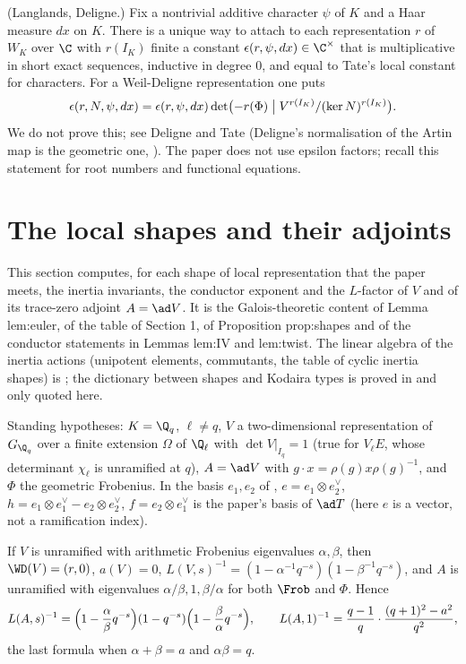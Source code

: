 \begin{theorem}\label{thm:local:epsilon}
(Langlands, Deligne.) Fix a nontrivial additive character $\psi$ of $K$ and a Haar measure $dx$ on $K$. There is a unique way to attach to each representation $r$
of $W_K$ over $\C$ with $r(I_K)$ finite a constant $\epsilon(r,\psi,dx)\in\C^\times$ that is multiplicative in short exact sequences, inductive in degree $0$, and
equal to Tate's local constant for characters. For a Weil-Deligne representation one puts
\[
\epsilon(r,N,\psi,dx)=\epsilon(r,\psi,dx)\det\bigl(-r(\Phi)\bigm|V^{r(I_K)}/(\ker N)^{r(I_K)}\bigr).
\]
We do not prove this; see Deligne \cite[Sections 4, 5 and 8]{Deligne73} and Tate \cite[Sections 3 and 4]{Tate79} (Deligne's normalisation of the Artin
map is the geometric one, ). The paper does not use epsilon factors;  recall this statement for
root numbers and functional equations.
\end{theorem}

\section{The local shapes and their adjoints}\label{sec:local:shapes}

This section computes, for each shape of local representation that the paper meets, the inertia invariants, the conductor exponent and the
$L$-factor of $V$ and of its trace-zero adjoint $A=\ad V$. It is the Galois-theoretic content of Lemma lem:euler, of the table of Section 1, of
Proposition prop:shapes and of the conductor statements in Lemmas lem:IV and lem:twist. The linear algebra of the inertia actions (unipotent
elements, commutants, the table of cyclic inertia shapes) is ; the dictionary between shapes and Kodaira types is proved in
 and only quoted here.

Standing hypotheses: $K=\Q_q$, $\ell\ne q$, $V$ a two-dimensional representation of $G_{\Q_q}$ over a finite extension $\Omega$ of $\Q_\ell$ with $\det V|_{I_q}=1$
(true for $V_\ell E$, whose determinant $\chi_\ell$ is unramified at $q$), $A=\ad V$ with $g\cdot x=\rho(g)x\rho(g)^{-1}$, and $\Phi$ the geometric Frobenius. In the
basis $e_1,e_2$ of , $e=e_1\otimes e_2^\vee$, $h=e_1\otimes e_1^\vee-e_2\otimes e_2^\vee$, $f=e_2\otimes e_1^\vee$ is the paper's basis of $\ad T$ (here $e$
is a vector, not a ramification index).

\begin{proposition}[unramified $V$]\label{prop:local:unramified-shape}
If $V$ is unramified with arithmetic Frobenius eigenvalues $\alpha,\beta$, then $\WD(V)=(r,0)$, $a(V)=0$, $L(V,s)^{-1}=(1-\alpha^{-1}q^{-s})(1-\beta^{-1}q^{-s})$, and $A$ is
unramified with eigenvalues $\alpha/\beta,1,\beta/\alpha$ for both $\Frob$ and $\Phi$. Hence
\[
L(A,s)^{-1}=\Bigl(1-\frac\alpha\beta q^{-s}\Bigr)(1-q^{-s})\Bigl(1-\frac\beta\alpha q^{-s}\Bigr),\qquad L(A,1)^{-1}=\frac{q-1}q\cdot\frac{(q+1)^2-a^2}{q^2},
\]
the last formula when $\alpha+\beta=a$ and $\alpha\beta=q$.
\end{proposition}


